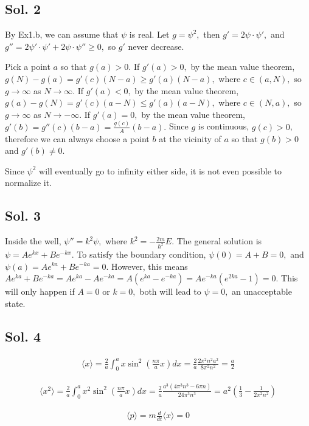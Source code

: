 \subsection*{Sol. 2}
By Ex1.b, we can assume that $\psi$ is real. Let $g=\psi^2,$ then $g'=2\psi\cdot\psi',$ and $g''=2\psi'\cdot\psi'+2\psi\cdot\psi''\geq 0,$ so $g'$ never decrease.

Pick a point $a$ so that $g(a)>0.$ 
If $g'(a)>0,$ by the mean value theorem, $g(N)-g(a)=g'(c)(N-a)\geq g'(a)(N-a),$ where $c\in(a,N),$ so $g\to\infty$ as $N\to\infty.$ 
If $g'(a)<0,$ by the mean value theorem, $g(a)-g(N)=g'(c)(a-N)\leq g'(a)(a-N),$ where $c\in(N,a),$ so $g\to \infty$ as $N\to -\infty.$ If $g'(a)=0,$ by the mean value theorem, $g'(b)=g''(c)(b-a)=\frac{g(c)}{A}(b-a).$ Since $g$ is continuous, $g(c)>0$, therefore we can always choose a point $b$ at the vicinity of $a$ so that $g(b)>0$ and $g'(b)\neq 0.$

Since $\psi^2$ will eventually go to infinity either side, it is not even possible to normalize it.

\subsection*{Sol. 3}
Inside the well, $\psi''=k^2\psi,$ where $k^2=-\frac{2m}{\hbar^2}E.$ The general solution is $\psi = Ae^{kx}+Be^{-kx}.$ To satisfy the boundary condition, $\psi(0)=A+B=0,$ and $\psi(a)=Ae^{ka}+Be^{-ka}=0.$ However, this means 
$Ae^{ka}+Be^{-ka}=Ae^{ka}-Ae^{-ka}=A(e^{ka}-e^{-ka})=Ae^{-ka}(e^{2ka}-1)=0.$ This will only happen if $A=0$ or $k=0,$ both will lead to $\psi=0,$ an unacceptable state. 


\subsection*{Sol. 4}

\begin{align*}
    \langle x\rangle
    =\frac{2}{a}\int_{0}^ax\sin^2\left(\frac{n\pi}{a}x\right)dx = \frac{2}{a}\frac{2\pi^2n^2a^2}{8\pi^2n^2}=\frac{a}{2}
\end{align*}

\begin{align*}
    \langle x^2\rangle
    =\frac{2}{a}\int_{0}^ax^2\sin^2\left(\frac{n\pi}{a}x\right)dx 
    = \frac{2}{a}\frac{a^3(4\pi^3n^3-6\pi n)}{24\pi^3n^3}=
    a^2\left(\frac{1}{3}-\frac{1}{2\pi^2n^2}    \right)
\end{align*}


\begin{align*}
    \langle p\rangle
    =m\frac{d}{dt}\langle x\rangle = 0
\end{align*}


